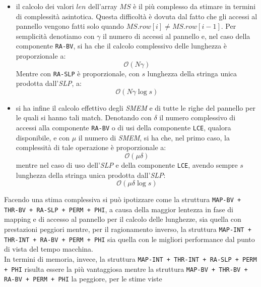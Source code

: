 \begin{itemize}
  \item il calcolo dei valori $len$ dell'array $MS$ è il più complesso da
  stimare in termini di complessità asintotica. Questa difficoltà è dovuta dal
  fatto che gli accessi al pannello vengono fatti solo quando $MS.row[i]\neq
  MS.row[i-1]$. Per semplicità denotiamo con $\gamma$ il numero di accessi al
  pannello e, nel caso della componente \texttt{RA-BV}, si ha che il calcolo
  complessivo delle lunghezza è proporzionale a:
  \begin{equation}
    \label{eq:msthr2bv}
    \mathcal{O}(N\gamma)
  \end{equation}
  Mentre con \texttt{RA-SLP} è proporzionale, con $s$ lunghezza della stringa
  unica prodotta dall'\textit{SLP}, a:
  \begin{equation}
    \label{eq:msthr2slp}
    \mathcal{O}\left(N\gamma\log s\right)
  \end{equation}
  \item si ha infine il calcolo effettivo degli \textit{SMEM} e di tutte le
  righe del pannello per le quali si hanno tali match. Denotando con $\delta$ il
  numero complessivo di accessi alla componente \texttt{RA-BV} o di usi della
  componente \texttt{LCE}, qualora disponibile, e con $\mu$ il numero di
  \textit{SMEM}, si ha che, nel primo caso, la complessità di tale operazione è
  proporzionale a:
  \begin{equation}
    \label{eq:msthr3bv}
    \mathcal{O}(\mu\delta)
  \end{equation}
  mentre nel caso di uso dell'\textit{SLP} e della componente \texttt{LCE},
  avendo sempre $s$ lunghezza della stringa unica prodotta dall'\textit{SLP}:
  \begin{equation}
    \label{eq:msthr3slp}
    \mathcal{O}(\mu\delta\log s)
  \end{equation}
\end{itemize}
Facendo una stima complessiva si può ipotizzare come la struttura \texttt{MAP-BV
+ THR-BV + RA-SLP + PERM + PHI}, a causa della maggior lentezza in fase di
mapping e di accesso al pannello per il calcolo delle lunghezze, sia quella con
prestazioni peggiori mentre, per il ragionamento inverso, la struttura
\texttt{MAP-INT + THR-INT + RA-BV + PERM + PHI} sia quella con le migliori
performance dal punto di vista del tempo macchina.\\
In termini di memoria, invece,  la struttura
\texttt{MAP-INT + THR-INT + RA-SLP + PERM + PHI} risulta essere la più
vantaggiosa mentre la struttura
\texttt{MAP-BV + THR-BV + RA-BV + PERM + PHI} la peggiore, per le stime viste
